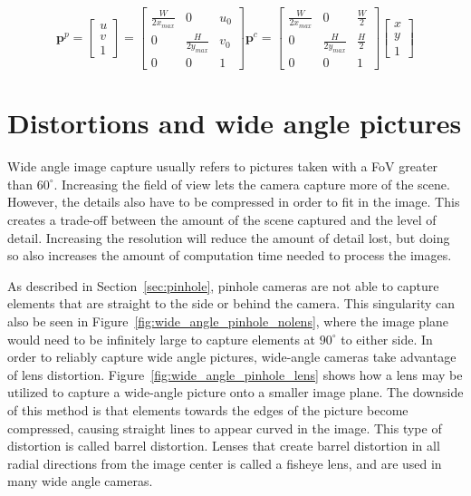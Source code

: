 \begin{equation}
    \mathbf{p}^p = \begin{bmatrix}
        u \\ v \\ 1
    \end{bmatrix} = \begin{bmatrix}
        \frac{W}{2x_{max}} & 0 & u_0 \\
        0 & \frac{H}{2y_{max}} & v_0 \\
        0 & 0 & 1
    \end{bmatrix} \mathbf{p}^c =
    \begin{bmatrix}
        \frac{W}{2x_{max}} & 0 & \frac{W}{2} \\
        0 & \frac{H}{2y_{max}} & \frac{H}{2} \\
        0 & 0 & 1
    \end{bmatrix}\begin{bmatrix}
        x \\ y \\ 1
    \end{bmatrix}
    \label{eq:pixel_transform}
\end{equation}

\section{Distortions and wide angle pictures}

Wide angle image capture usually refers to pictures taken with a FoV greater than $60^\circ$. Increasing the field of view lets the camera capture more of the scene. However, the details also have to be compressed in order to fit in the image. This creates a trade-off between the amount of the scene captured and the level of detail. Increasing the resolution will reduce the amount of detail lost, but doing so also increases the amount of computation time needed to process the images.

As described in Section~\ref{sec:pinhole}, pinhole cameras are not able to capture elements that are straight to the side or behind the camera. This singularity can also be seen in Figure~\ref{fig:wide_angle_pinhole_nolens}, where the image plane would need to be infinitely large to capture elements at $90^\circ$ to either side. In order to reliably capture wide angle pictures, wide-angle cameras take advantage of lens distortion. Figure~\ref{fig:wide_angle_pinhole_lens} shows how a lens may be utilized to capture a wide-angle picture onto a smaller image plane. The downside of this method is that elements towards the edges of the picture become compressed, causing straight lines to appear curved in the image. This type of distortion is called barrel distortion. Lenses that create barrel distortion in all radial directions from the image center is called a fisheye lens, and are used in many wide angle cameras.

